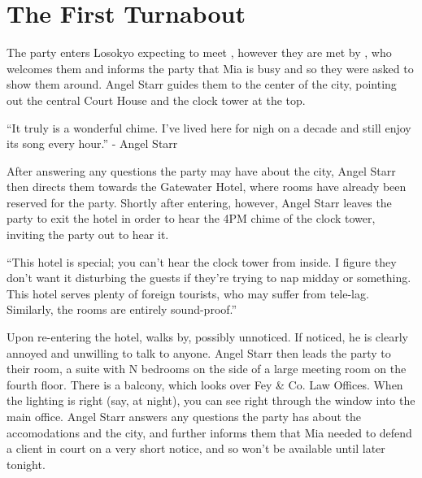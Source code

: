 \section{The First Turnabout}
The party enters Losokyo expecting to meet , however they are met by , who welcomes them and informs the party that Mia is busy and so they were asked to show them around. Angel Starr guides them to the center of the city, pointing out the central Court House and the clock tower at the top. 
\begin{center}
``It truly is a wonderful chime. I've lived here for nigh on a decade and still enjoy its song every hour.''
- Angel Starr \end{center}

After answering any questions the party may have about the city, Angel Starr then directs them towards the Gatewater Hotel, where rooms have already been reserved for the party. Shortly after entering, however, Angel Starr leaves the party to exit the hotel in order to hear the 4PM chime of the clock tower, inviting the party out to hear it.

\begin{center}
``This hotel is special; you can't hear the clock tower from inside. I figure they don't want it disturbing the guests if they're trying to nap midday or something. This hotel serves plenty of foreign tourists, who may suffer from tele-lag. Similarly, the rooms are entirely sound-proof.''
\end{center}

Upon re-entering the hotel,  walks by, possibly unnoticed. If noticed, he is clearly annoyed and unwilling to talk to anyone. Angel Starr then leads the party to their room, a suite with N bedrooms on the side of a large meeting room on the fourth floor. There is a balcony, which looks over Fey \& Co. Law Offices. When the lighting is right (say, at night), you can see right through the window into the main office. Angel Starr answers any questions the party has about the accomodations and the city, and further informs them that Mia needed to defend a client in court on a very short notice, and so won't be available until later tonight.

